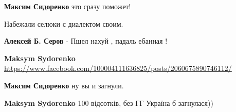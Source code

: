 \begin{itemize}
\begin{itemize}
 
\textbf{Максим Сидоренко} это сразу поможет!

 
Набежали селюки с диалектом своим.

\begin{itemize}
 
\textbf{Алексей Б. Серов}
- Пшел нахуй , падаль ебанная !
\end{itemize}

 
\textbf{Maksym Sydorenko} \url{https://www.facebook.com/100004111636825/posts/2060675890746112/}

 
\textbf{Максим Сидоренко} ну вы и загнули.

 
\textbf{Maksym Sydorenko} 100 відсотків, без ГГ Україна б загнулася))

 

\end{itemize}
\end{itemize}

